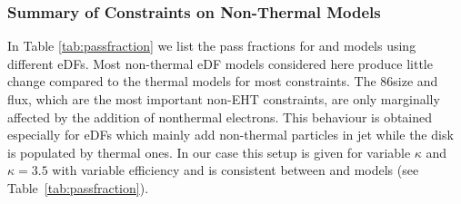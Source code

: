 






\subsubsection{Summary of Constraints on Non-Thermal Models}
In Table \ref{tab:passfraction} we list the pass fractions for \bhac and \hamr models using different eDFs.
Most non-thermal eDF models considered here produce little change compared to the thermal models for most constraints. The 86\GHz size and flux, which are the most important non-EHT constraints, are only marginally affected by the addition of nonthermal electrons. This behaviour is obtained especially for eDFs which mainly add non-thermal particles in jet while the disk is populated by thermal ones. In our case this setup is given for variable $\kappa$ and $\kappa=3.5$ with variable efficiency and is consistent between \bhac and \hamr models (see Table~\ref{tab:passfraction}).

